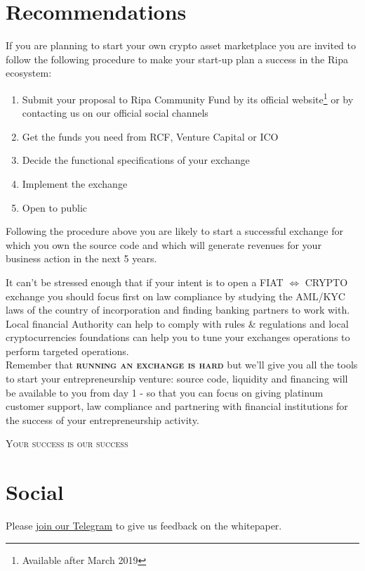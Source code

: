 \documentclass[11pt,fleqn,oneside]{book} %
\begin{document}
\section{Recommendations}
If you are planning to start your own crypto asset marketplace you are invited to follow the following procedure to make
your start-up plan a success in the Ripa ecosystem:
\begin{enumerate}
	\item Submit your proposal to Ripa Community Fund by its official website\footnote{Available after March 2019} or by contacting us
	on our official social channels
	\item Get the funds you need from RCF, Venture Capital or ICO
	\item Decide the functional specifications of your exchange
	\item Implement the exchange
	\item Open to public
\end{enumerate}

Following the procedure above you are likely to start a successful exchange for which you own the source code and which will 
generate revenues for your business action in the next 5 years.

It can't be stressed enough that if your intent is to open a FIAT $\Leftrightarrow$ CRYPTO exchange you should
focus first on law compliance by studying the AML/KYC laws of the country of incorporation and
finding banking partners to work with. Local financial Authority can help to comply with rules \& regulations and 
local cryptocurrencies foundations can help you to tune your exchanges operations to perform targeted
operations.\\

Remember that \textbf{\textsc{running an exchange is hard}} but we'll give you all the tools to start your entrepreneurship venture:
source code, liquidity and financing will be available to you from day 1 - 
so that you can focus on giving platinum customer support, law compliance and partnering with financial institutions 
for the success of your entrepreneurship activity.

\textsc{Your success is our success}

\section{Social}
\label{sec:social}
Please \href{https://t.me/ripaex}{join our Telegram} to give us feedback on the whitepaper.\\
\end{document}
